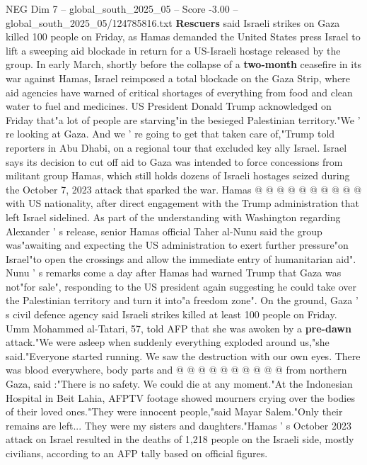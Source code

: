 \begin{textsample}{NEG Dim 7 – global\_south\_2025\_05 – Score -3.00 – global\_south\_2025\_05/124785816.txt}  \label{ex:f7_neg_001}
\textbf{Rescuers} said Israeli strikes on Gaza killed 100 people on Friday, as Hamas demanded the United States press Israel to lift a sweeping aid blockade in return for a US-Israeli hostage released by the group.
In early March, shortly before the collapse of a \textbf{two-month} ceasefire in its war against Hamas, Israel reimposed a total blockade on the Gaza Strip, where aid agencies have warned of critical shortages of everything from food and clean water to fuel and medicines.
US President Donald Trump acknowledged on Friday that"a lot of people are starving"in the besieged Palestinian territory."We ' re looking at Gaza.
And we ' re going to get that taken care of,"Trump told reporters in Abu Dhabi, on a regional tour that excluded key ally Israel.
Israel says its decision to cut off aid to Gaza was intended to force concessions from militant group Hamas, which still holds dozens of Israeli hostages seized during the October 7, 2023 attack that sparked the war.
Hamas @ @ @ @ @ @ @ @ @ @ with US nationality, after direct engagement with the Trump administration that left Israel sidelined.
As part of the understanding with Washington regarding Alexander ' s release, senior Hamas official Taher al-Nunu said the group was"awaiting and expecting the US administration to exert further pressure"on Israel"to open the crossings and allow the immediate entry of humanitarian aid".
Nunu ' s remarks come a day after Hamas had warned Trump that Gaza was not"for sale", responding to the US president again suggesting he could take over the Palestinian territory and turn it into"a freedom zone".
On the ground, Gaza ' s civil defence agency said Israeli strikes killed at least 100 people on Friday.
Umm Mohammed al-Tatari, 57, told AFP that she was awoken by a \textbf{pre-dawn} attack."We were asleep when suddenly everything exploded around us,"she said."Everyone started running.
We saw the destruction with our own eyes.
There was blood everywhere, body parts and @ @ @ @ @ @ @ @ @ @ from northern Gaza, said :"There is no safety.
We could die at any moment."At the Indonesian Hospital in Beit Lahia, AFPTV footage showed mourners crying over the bodies of their loved ones."They were innocent people,"said Mayar Salem."Only their remains are left...
They were my sisters and daughters."Hamas ' s October 2023 attack on Israel resulted in the deaths of 1,218 people on the Israeli side, mostly civilians, according to an AFP tally based on official figures.

\end{textsample}
